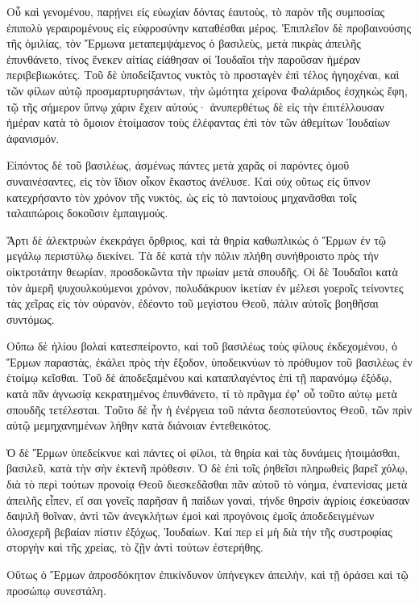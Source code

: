 {Οὗ καὶ γενομένου, παρῄνει εἰς εὐωχίαν δόντας ἑαυτοὺς, τὸ παρὸν τῆς συμποσίας ἐπιπολὺ γεραιρομένους εἰς εὐφροσύνην καταθέσθαι μέρος.
Ἐπιπλεῖον δὲ προβαινούσης τῆς ὁμιλίας, τὸν Ἕρμωνα μεταπεμψάμενος ὁ βασιλεὺς, μετὰ πικρὰς ἀπειλῆς ἐπυνθάνετο, τίνος ἕνεκεν αἰτίας εἰάθησαν οἱ Ἰουδαῖοι τὴν παροῦσαν ἡμέραν περιβεβιωκότες.
Τοῦ δὲ ὑποδείξαντος νυκτὸς τὸ προσταγὲν ἐπὶ τέλος ἠγηοχέναι, καὶ τῶν φίλων αὐτῷ προσμαρτυρησάντων,
τὴν ὠμότητα χείρονα Φαλάριδος ἐσχηκὼς ἔφη, τῷ τῆς σήμερον ὕπνῳ χάριν ἔχειν αὐτούς· ἀνυπερθέτως δὲ εἰς τὴν ἐπιτέλλουσαν ἡμέραν κατὰ τὸ ὅμοιον ἑτοίμασον τοὺς ἐλέφαντας ἐπὶ τὸν τῶν ἀθεμίτων Ἰουδαίων ἀφανισμόν.
\par }{\PP {}Εἰπόντος δὲ τοῦ βασιλέως, ἀσμένως πάντες μετὰ χαρᾶς οἱ παρόντες ὁμοῦ συναινέσαντες, εἰς τὸν ἴδιον οἶκον ἕκαστος ἀνέλυσε.
Καὶ οὐχ οὕτως εἰς ὕπνον κατεχρήσαντο τὸν χρόνον τῆς νυκτὸς, ὡς εἰς τὸ παντοίους μηχανᾶσθαι τοῖς ταλαιπώροις δοκοῦσιν ἐμπαιγμούς.
\par }{\PP {}Ἄρτι δὲ ἀλεκτρυὼν ἐκεκράγει ὄρθριος, καὶ τὰ θηρία καθωπλικὼς ὁ Ἕρμων ἐν τῷ μεγάλῳ περιστύλῳ διεκίνει.
Τὰ δὲ κατὰ τὴν πόλιν πλήθη συνήθροιστο πρὸς τὴν οἰκτροτάτην θεωρίαν, προσδοκῶντα τὴν πρωίαν μετὰ σπουδῆς.
Οἱ δὲ Ἰουδαῖοι κατὰ τὸν ἀμερῆ ψυχουλκούμενοι χρόνον, πολυδάκρυον ἱκετίαν ἐν μέλεσι γοεροῖς τείνοντες τὰς χεῖρας εἰς τὸν οὐρανὸν, ἐδέοντο τοῦ μεγίστου Θεοῦ, πάλιν αὐτοῖς βοηθῆσαι συντόμως.
\par }{\PP {}Οὔπω δὲ ἡλίου βολαὶ κατεσπείροντο, καὶ τοῦ βασιλέως τοὺς φίλους ἐκδεχομένου, ὁ Ἕρμων παραστὰς, ἐκάλει πρὸς τὴν ἔξοδον, ὑποδεικνύων τὸ πρόθυμον τοῦ βασιλέως ἐν ἑτοίμῳ κεῖσθαι.
Τοῦ δὲ ἀποδεξαμένου καὶ καταπλαγέντος ἐπὶ τῇ παρανόμῳ ἐξόδῳ, κατὰ πᾶν ἀγνωσίᾳ κεκρατημένος ἐπυνθάνετο, τί τὸ πρᾶγμα ἐφʼ οὗ τοῦτο αὐτῳ μετὰ σπουδῆς τετέλεσται.
Τοῦτο δὲ ἦν ἡ ἐνέργεια τοῦ πάντα δεσποτεύοντος Θεοῦ, τῶν πρὶν αὐτῷ μεμηχανημένων λήθην κατὰ διάνοιαν ἐντεθεικότος.
\par }{\PP {}Ὁ δὲ Ἕρμων ὑπεδείκνυε καὶ πάντες οἱ φίλοι, τὰ θηρία καὶ τὰς δυνάμεις ἡτοιμάσθαι, βασιλεῦ, κατὰ τὴν σὴν ἐκτενῆ πρόθεσιν.
Ὁ δὲ ἐπὶ τοῖς ῥηθεῖσι πληρωθεὶς βαρεῖ χόλῳ, διὰ τὸ περὶ τούτων προνοίᾳ Θεοῦ διεσκεδᾶσθαι πᾶν αὐτοῦ τὸ νόημα, ἐνατενίσας μετὰ ἀπειλῆς εἶπεν,
εἴ σαι γονεῖς παρῆσαν ἢ παίδων γοναὶ, τήνδε θηρσὶν ἀγρίοις ἐσκεύασαν δαψιλῆ θοῖναν, ἀντὶ τῶν ἀνεγκλήτων ἐμοὶ καὶ προγόνοις ἐμοῖς ἀποδεδειγμένων ὁλοσχερῆ βεβαίαν πίστιν ἐξόχως, Ἰουδαίων.
Καί περ εἰ μὴ διὰ τὴν τῆς συστροφίας στοργὴν καὶ τῆς χρείας, τὸ ζῇν ἀντὶ τούτων ἐστερήθης.
\par }{\PP {}Οὕτως ὁ Ἕρμων ἀπροσδόκητον ἐπικίνδυνον ὑπήνεγκεν ἀπειλὴν, καὶ τῇ ὁράσει καὶ τῷ προσώπῳ συνεστάλη.
}
